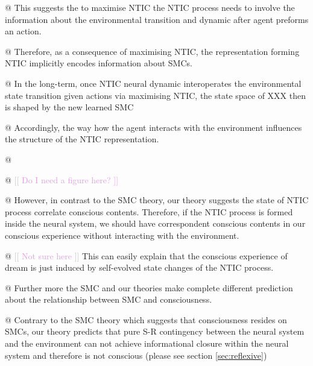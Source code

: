 \documentclass[utf8]{article}
\newenvironment{ants}
			{
			 \begin{easylist}[itemize]
		 	}
			{
			\end{easylist}
			} %
\newcommand{\idea}[2][Plum]{\noindent
				\textcolor{#1}{[[ #2 ]]}}
\begin{document}
\begin{ants}
				@ This suggests the to maximise NTIC the NTIC process needs to involve the information about the environmental transition and dynamic after agent preforms an action.


				@ Therefore, as a consequence of maximising NTIC, the representation forming NTIC implicitly encodes information about SMCs.

				@ In the long-term, once NTIC neural dynamic interoperates the environmental state transition given actions via maximising NTIC, the state space of XXX then is shaped by the new learned SMC

				@ Accordingly, the way how the agent interacts with the environment influences the structure of the NTIC representation.



				@ 

				@ \idea{Do I need a figure here?}

				@ However, in contrast to the SMC theory, our theory suggests the state of NTIC process correlate conscious contents. Therefore, if the NTIC process is formed inside the neural system, we should have correspondent conscious contents in our conscious experience without interacting with the environment.

				@ \idea{Not sure here} This can easily explain that the conscious experience of dream is just induced by self-evolved state changes of the NTIC process.


				@ Further more the SMC and our theories make complete different prediction about the relationship between SMC and consciousness.

				@ Contrary to the SMC theory which suggests that consciousness resides on SMCs, our theory predicts that pure S-R contingency between the neural system and the environment can not achieve informational closure within the neural system and therefore is not conscious (please see section \ref{sec:reflexive})

			\end{ants}
\end{document}
